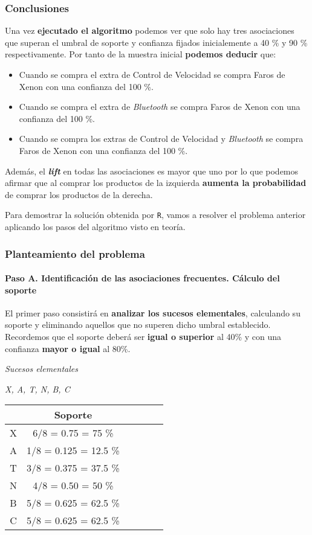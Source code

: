 \documentclass [a4paper] {article}
\begin{document}
\subsubsection{Conclusiones}
Una vez \textbf{ejecutado el algoritmo} podemos ver que solo hay tres asociaciones que superan el
umbral de soporte y confianza fijados inicialemente a 40 \% y 90 \% respectivamente.
Por tanto de la muestra inicial \textbf{podemos deducir} que:
\begin{itemize}
	\item Cuando se compra el extra de Control de Velocidad se compra Faros de Xenon
	      con una confianza del 100 \%.
	\item Cuando se compra el extra de \textit{Bluetooth} se compra Faros de Xenon
	      con una confianza del 100 \%.
	\item Cuando se compra los extras de Control de Velocidad y \textit{Bluetooth} se compra Faros de Xenon
	      con una confianza del 100 \%.
\end{itemize}

Además, el \textbf{\textit{lift}} en todas las asociaciones es mayor que uno por lo que podemos afirmar que al comprar
los productos de la izquierda \textbf{aumenta la probabilidad} de comprar los productos de la derecha.

Para demostrar la solución obtenida por \texttt{R}, vamos a resolver el problema anterior aplicando los pasos del algoritmo visto en teoría.
\subsubsection{Planteamiento del problema}

\paragraph{Paso A. Identificación de las asociaciones frecuentes. Cálculo del soporte}
El primer paso consistirá en \textbf{analizar los sucesos elementales}, calculando su soporte y eliminando aquellos que no superen dicho umbral establecido.
Recordemos que el soporte deberá ser \textbf{igual o superior} al 40\% y con una confianza \textbf{mayor o igual} al 80\%.

\hfil \textit{Sucesos elementales} \par
\hfil \textit{X, A, T, N, B, C} \par

\begin{center}
\begin{tabular}{|c|c|c|c|c|c|}
\hline
        & Soporte\\ \hline
X & 6/8 = 0.75 = 75 \%		  \\ \hline
A & 1/8 = 0.125 = 12.5 \%     \\ \hline
T & 3/8 = 0.375 = 37.5 \%     \\ \hline
N & 4/8 = 0.50  =  50 \%      \\ \hline
B & 5/8 = 0.625 = 62.5 \%     \\ \hline
C & 5/8 = 0.625 = 62.5 \%     \\ \hline
\end{tabular}
\end{center}
\end{document}
